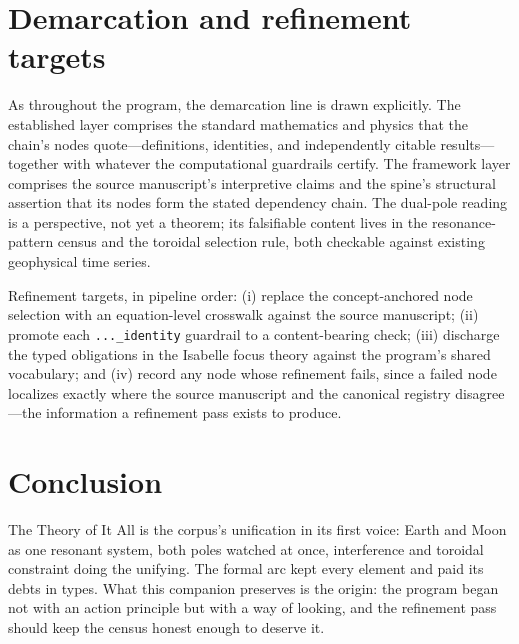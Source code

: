 \documentclass[11pt]{article}
\theoremstyle{remark}
\begin{document}
\section{Demarcation and refinement targets}
\label{sec:demarc}

As throughout the program, the demarcation line is drawn explicitly. The established layer comprises the standard mathematics and physics that the chain's nodes quote---definitions, identities, and independently citable results---together with whatever the computational guardrails certify. The framework layer comprises the source manuscript's interpretive claims and the spine's structural assertion that its nodes form the stated dependency chain. The dual-pole reading is a perspective, not yet a theorem; its falsifiable content lives in the resonance-pattern census and the toroidal selection rule, both checkable against existing geophysical time series.

Refinement targets, in pipeline order: (i) replace the concept-anchored node selection with an equation-level crosswalk against the source manuscript; (ii) promote each \texttt{...\_identity} guardrail to a content-bearing check; (iii) discharge the typed obligations in the Isabelle focus theory against the program's shared vocabulary; and (iv) record any node whose refinement fails, since a failed node localizes exactly where the source manuscript and the canonical registry disagree---the information a refinement pass exists to produce.

\section{Conclusion}
\label{sec:conc}

The Theory of It All is the corpus's unification in its first voice: Earth and Moon as one resonant system, both poles watched at once, interference and toroidal constraint doing the unifying. The formal arc kept every element and paid its debts in types. What this companion preserves is the origin: the program began not with an action principle but with a way of looking, and the refinement pass should keep the census honest enough to deserve it.
\end{document}
